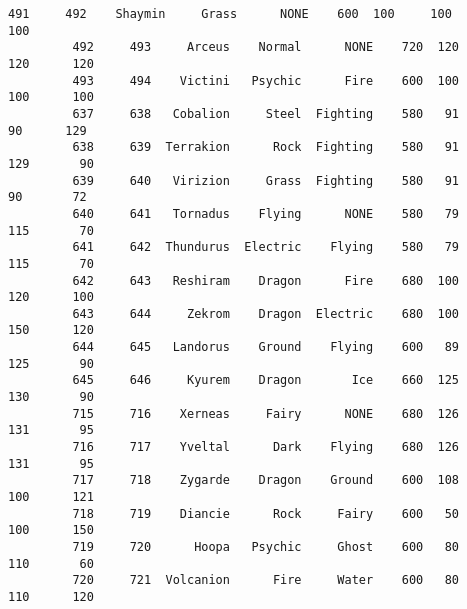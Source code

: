 \documentclass[11pt]{article}
\begin{document}
\begin{Verbatim}[commandchars=\\\{\}]
         491     492    Shaymin     Grass      NONE    600  100     100      100   
         492     493     Arceus    Normal      NONE    720  120     120      120   
         493     494    Victini   Psychic      Fire    600  100     100      100   
         637     638   Cobalion     Steel  Fighting    580   91      90      129   
         638     639  Terrakion      Rock  Fighting    580   91     129       90   
         639     640   Virizion     Grass  Fighting    580   91      90       72   
         640     641   Tornadus    Flying      NONE    580   79     115       70   
         641     642  Thundurus  Electric    Flying    580   79     115       70   
         642     643   Reshiram    Dragon      Fire    680  100     120      100   
         643     644     Zekrom    Dragon  Electric    680  100     150      120   
         644     645   Landorus    Ground    Flying    600   89     125       90   
         645     646     Kyurem    Dragon       Ice    660  125     130       90   
         715     716    Xerneas     Fairy      NONE    680  126     131       95   
         716     717    Yveltal      Dark    Flying    680  126     131       95   
         717     718    Zygarde    Dragon    Ground    600  108     100      121   
         718     719    Diancie      Rock     Fairy    600   50     100      150   
         719     720      Hoopa   Psychic     Ghost    600   80     110       60   
         720     721  Volcanion      Fire     Water    600   80     110      120   
         

\end{Verbatim}
\end{document}
